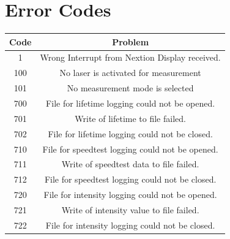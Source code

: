 	\section{Error Codes}
		\begin{tabular}{|c|c|}
			\hline 
			Code & Problem \\ 
			\hline 
			1 & Wrong Interrupt from Nextion Display received.\\
			\hline
			\hline
			100 & No laser is activated for measurement \\ 
			\hline 
			101 & No measurement mode is selected \\
			\hline
			\hline
			700 & File for lifetime logging could not be opened. \\ 
			\hline 
			701 & Write of lifetime to file failed.   \\ 
			\hline 
			702 & File for lifetime logging could not be closed. \\ 
			\hline 
			710 & File for speedtest logging could not be opened. \\ 
			\hline 
			711 & Write of speedtest data to file failed.   \\ 
			\hline 
			712 & File for speedtest logging could not be closed. \\ 
			\hline 		
			720 & File for intensity logging could not be opened. \\ 
			\hline 
			721 & Write of intensity value to file failed.   \\ 
			\hline 
			722 & File for intensity logging could not be closed. \\ 
			\hline 
		\end{tabular} 

	
	
